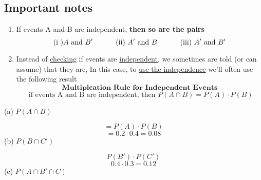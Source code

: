 \documentclass{report}
\begin{document}
\subsection*{Important notes}
\bigbreak \noindent
\begin{mdframed}
 \begin{enumerate}
   \vspace{5mm}

   \item If events A and B are independent, \textbf{then so are the pairs}
     $$ \text{(i )} A \text{ and } B'\hspace{10mm} \text{ (ii) } A' \text{ and } B \hspace{10mm} \text{ (iii) } A' \text{ and } B'$$
     \vspace{1mm}

   \item Instead of \underline{checking} if events are \underline{independent}, we sometimes are told (or can assume) that they are, In this case, to \underline{use the independence} we'll often use the following result
    \bigbreak \noindent \bigbreak \noindent
     $$\textbf{Multiplcation Rule for Independent Events}$$
     $$\text{ if events A and B are independent, then }P(A \cap B) = P(A) \cdot P(B)$$
     \vspace{3mm}

 \end{enumerate} 
\end{mdframed}
\bigbreak \noindent \bigbreak \noindent
{}
\bigbreak \noindent
(a) $P(A \cap B)$
\vspace{4mm}

$$ = P(A) \cdot P(B)$$
$$ = 0.2 \cdot 0.4 = 0.08$$
\bigbreak \noindent
(b) $P(B \cap C')$
\vspace{4mm}

$$P(B') \cdot P(C')$$
$$0.4 \cdot 0.3 = 0.12$$
\bigbreak \noindent
(c) $P(A \cap B' \cap C)$
\vspace{3mm}
\end{document}
